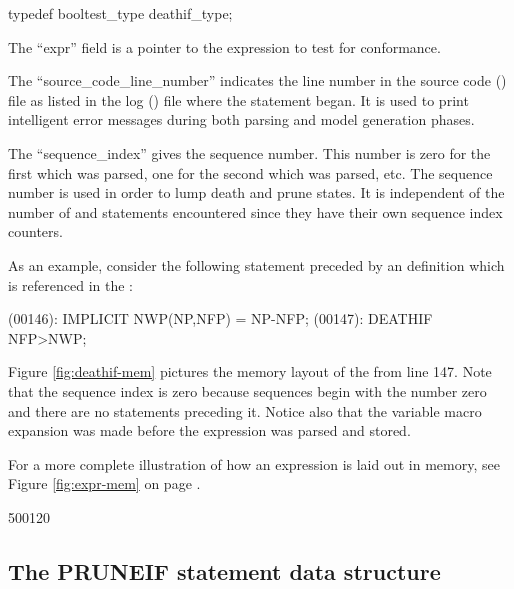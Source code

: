 \begin{codeexample}
typedef booltest_type deathif_type;
\end{codeexample}


The ``expr'' field is a pointer to the expression to test for conformance.

The ``source\_code\_line\_number'' indicates the line number in the source
code () file as listed in the log () file
where the statement began.   It is used to print intelligent
error messages during both parsing and model generation phases.

The ``sequence\_index'' gives the  sequence number.   This number
is zero for the first  which was parsed, one for the second
 which was parsed, etc.   The sequence number is used in order
to lump death and prune states.  It is independent of the number of 
and  statements encountered since they have their own sequence
index counters.

As an example, consider the following  statement preceded by an
 definition which is referenced in the :
\begin{logfileexample}
(00146): IMPLICIT NWP(NP,NFP) = NP-NFP;
(00147): DEATHIF NFP>NWP;
\end{logfileexample}

Figure \ref{fig:deathif-mem} pictures the memory layout of the 
from line 147.
Note that the sequence index is zero because sequences begin with
the number zero and there are no  statements preceding it.
Notice also that the  variable macro expansion was made
before the expression was parsed and stored.

For a more complete illustration of how an expression is laid out in
memory, see Figure \ref{fig:expr-mem} on page \pageref{fig:expr-mem}.

\startfig
\begin{fast_picture}{500}{120}
\savFboxpos
{}
      \stackBbox
      \nextBbox{}
      \nextBbox{}
      \nextBbox{}
\nextFbox{}
\end{fast_picture}

\subsection{The PRUNEIF statement data structure}
\label{sec:pruneif}

